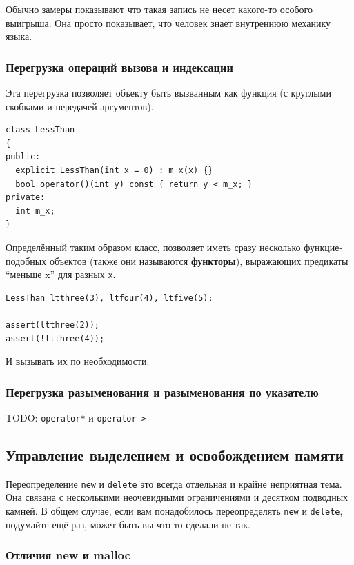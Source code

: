 \documentclass[a4paper,12pt,oneside]{article}
\begin{document}
Обычно замеры показывают что такая запись не несет какого-то особого выигрыша. Она просто показывает, что человек знает внутреннюю механику языка.

\subsubsection{Перегрузка операций вызова и индексации}\label{BracketOverloading}

Эта перегрузка позволяет объекту быть вызванным как функция (с круглыми скобками и передачей аргументов).

\begin{lstlisting}
class LessThan
{
public:
  explicit LessThan(int x = 0) : m_x(x) {}
  bool operator()(int y) const { return y < m_x; }
private:
  int m_x;
}
\end{lstlisting}

Определённый таким образом класс, позволяет иметь сразу несколько функцие-подобных объектов (также они называются \textbf{функторы}), выражающих предикаты ``меньше x'' для разных \lstinline!x!.

\begin{lstlisting}
LessThan ltthree(3), ltfour(4), ltfive(5);

assert(ltthree(2));
assert(!ltthree(4));
\end{lstlisting}

И вызывать их по необходимости.

\subsubsection{Перегрузка разыменования и разыменования по указателю}\label{DereferenceOverloading}

TODO: \lstinline!operator*! и \lstinline!operator->!

\pagebreak
\subsection{Управление выделением и освобождением памяти}\label{MemManage}

Переопределение \lstinline!new! и \lstinline!delete! это всегда отдельная и крайне неприятная тема. Она связана с несколькими неочевидными ограничениями и десятком подводных камней. В общем случае, если вам понадобилось переопределять \lstinline!new! и \lstinline!delete!, подумайте ещё раз, может быть вы что-то сделали не так.

\subsubsection{Отличия new и malloc}\label{NewMalloc}
\end{document}
